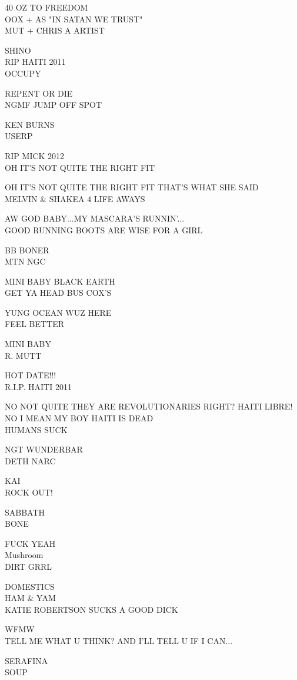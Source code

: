 \documentclass[10pt,letterpaper]{article}
\begin{document}
40 OZ TO FREEDOM\\
OOX + AS "IN SATAN WE TRUST"\\
MUT + CHRIS A ARTIST

SHINO\\
RIP HAITI 2011\\
OCCUPY

REPENT OR DIE\\
NGMF JUMP OFF SPOT

KEN BURNS\\
USERP

RIP MICK 2012\\
OH IT'S NOT QUITE THE RIGHT FIT

OH IT'S NOT QUITE THE RIGHT FIT THAT'S WHAT SHE SAID\\
MELVIN \& SHAKEA 4 LIFE AWAYS

AW GOD BABY...MY MASCARA'S RUNNIN'...\\
GOOD RUNNING BOOTS ARE WISE FOR A GIRL

BB BONER\\
MTN NGC

MINI BABY BLACK EARTH\\
GET YA HEAD BUS COX'S

YUNG OCEAN WUZ HERE\\
FEEL BETTER

MINI BABY\\
R. MUTT

HOT DATE!!!\\
R.I.P. HAITI 2011

NO NOT QUITE THEY ARE REVOLUTIONARIES RIGHT?  HAITI LIBRE!  NO I MEAN MY BOY HAITI IS DEAD\\
HUMANS SUCK

NGT WUNDERBAR\\
DETH NARC

KAI\\
ROCK OUT!

SABBATH\\
BONE

FUCK YEAH\\
Mushroom\\
DIRT GRRL

DOMESTICS\\
HAM \& YAM\\
KATIE ROBERTSON SUCKS A GOOD DICK

WFMW\\
TELL ME WHAT U THINK?  AND I'LL TELL U IF I CAN...

SERAFINA\\
SOUP
\end{document}
